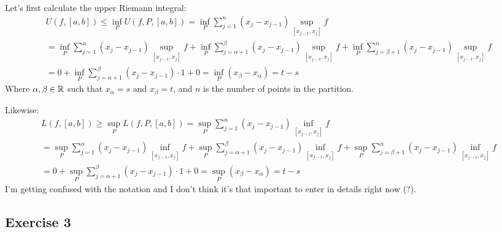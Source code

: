 \begin{center}
\end{center}
\newpara
Let's first calculate the upper Riemann integral:
\begin{align*}
	U(f, [a,b]) \leq \inf_PU(f, P, [a,b]) = \inf_P\sum_{j=1}^n(x_j-x_{j-1})\sup_{[x_{j-1},x_j]}f\\
	=\inf_P\sum_{j=1}^\alpha(x_j-x_{j-1})\sup_{[x_{j-1},x_j]}f+\inf_P\sum_{j=\alpha+1}^\beta(x_j-x_{j-1})\sup_{[x_{j-1},x_j]}f+\inf_P\sum_{j=\beta+1}^n(x_j-x_{j-1})\sup_{[x_{j-1},x_j]}f\\
	=0+\inf_P\sum_{j=\alpha+1}^\beta(x_j-x_{j-1})\cdot1+0=\inf_P(x_\beta-x_{\alpha})=t-s
\end{align*}
Where $\alpha,\beta\in\mathbb{R}$ such that $x_\alpha=s$ and $x_\beta=t$, and $n$ is the number of points in the partition.

Likewise:
\begin{align*}
	L(f, [a,b]) \geq \sup_PL(f, P, [a,b]) = \sup_P\sum_{j=1}^n(x_j-x_{j-1})\inf_{[x_{j-1},x_j]}f\\	=\sup_P\sum_{j=1}^\alpha(x_j-x_{j-1})\inf_{[x_{j-1},x_j]}f+\sup_P\sum_{j=\alpha+1}^\beta(x_j-x_{j-1})\inf_{[x_{j-1},x_j]}f+\sup_P\sum_{j=\beta+1}^n(x_j-x_{j-1})\inf_{[x_{j-1},x_j]}f\\
	=0+\sup_P\sum_{j=\alpha+1}^\beta(x_j-x_{j-1})\cdot1+0=\sup_P(x_\beta-x_\alpha)=t-s
\end{align*}
I'm getting confused with the notation and I don't think it's that important to enter in details right now (?).

\subsection{Exercise 3}


